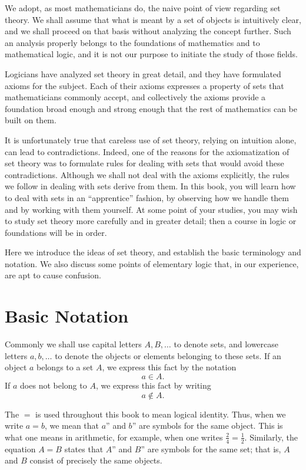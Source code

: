
We adopt, as most mathematicians do, the naive point of view\cite{Halmos1960} regarding set theory. 
We shall assume that what is meant by a set of objects is intuitively clear, 
and we shall proceed on that basis without analyzing the concept further. 
Such an analysis properly belongs to the foundations of mathematics\cite{Wilder1965} and to mathematical logic, 
and it is not our purpose to initiate the study of those fields.

Logicians have analyzed set theory in great detail, 
and they have formulated axioms for the subject. 
Each of their axioms expresses a property of sets that mathematicians commonly accept, 
and collectively the axioms provide a foundation broad enough and strong enough that the rest of mathematics can be built on them.

It is unfortunately true that careless use of set theory, 
relying on intuition alone, can lead to contradictions. 
Indeed, one of the reasons for the axiomatization of set theory was to formulate rules for dealing with sets that would avoid these contradictions. 
Although we shall not deal with the axioms explicitly, the rules we follow in dealing with sets derive from them. In this book, you will learn how to 
deal with sets in an ``apprentice'' fashion, by observing how we handle them and by working with them yourself. 
At some point of your studies, you may wish to study set theory more carefully and in greater detail; 
then a course in logic or foundations will be in order.


Here we introduce the ideas of set theory, and establish the basic terminology and notation. 
We also discuss some points of elementary logic that, in our experience, are apt to cause confusion.

\section*{Basic Notation}

Commonly we shall use capital letters \(A,B,\ldots\) to denote sets, 
and lowercase letters \(a,b,\ldots\) to denote the objects or elements belonging to these sets. 
If an object \(a\) belongs to a set \(A\), we express this fact by the notation
\[
a \in A\text{.}
\]
If \(a\) does not belong to \(A\), we express this fact by writing
\[
a \notin A\text{.}
\]

The  \(=\) is used throughout this book to mean logical identity. 
Thus, when we write \(a = b\), we mean that \(a\)'' 
and \(b\)'' are symbols for the same object. 
This is what one means in arithmetic, for example, when one writes \(\frac{2}{4} = \frac{1}{2}\). 
Similarly, the equation \(A = B\) states that \(A\)'' and \(B\)'' are symbols for the same set; 
that is, \(A\) and \(B\) consist of precisely the same objects.

